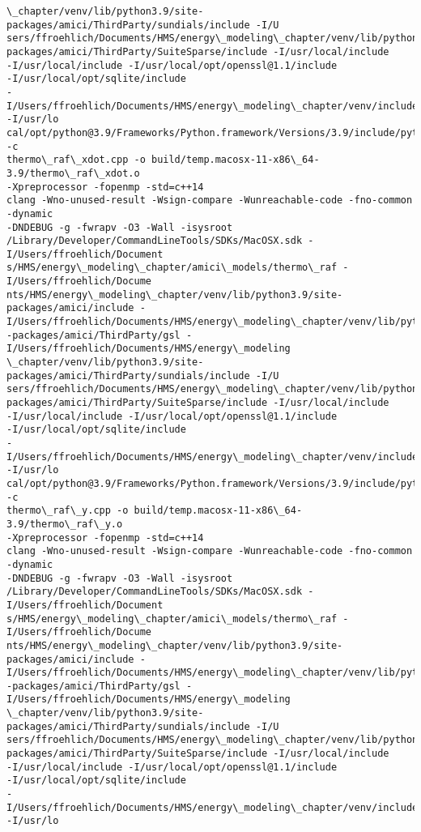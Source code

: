 \documentclass[11pt]{article}
\begin{document}
\begin{Verbatim}[commandchars=\\\{\}]
\_chapter/venv/lib/python3.9/site-packages/amici/ThirdParty/sundials/include -I/U
sers/ffroehlich/Documents/HMS/energy\_modeling\_chapter/venv/lib/python3.9/site-
packages/amici/ThirdParty/SuiteSparse/include -I/usr/local/include
-I/usr/local/include -I/usr/local/opt/openssl@1.1/include
-I/usr/local/opt/sqlite/include
-I/Users/ffroehlich/Documents/HMS/energy\_modeling\_chapter/venv/include -I/usr/lo
cal/opt/python@3.9/Frameworks/Python.framework/Versions/3.9/include/python3.9 -c
thermo\_raf\_xdot.cpp -o build/temp.macosx-11-x86\_64-3.9/thermo\_raf\_xdot.o
-Xpreprocessor -fopenmp -std=c++14
clang -Wno-unused-result -Wsign-compare -Wunreachable-code -fno-common -dynamic
-DNDEBUG -g -fwrapv -O3 -Wall -isysroot
/Library/Developer/CommandLineTools/SDKs/MacOSX.sdk -I/Users/ffroehlich/Document
s/HMS/energy\_modeling\_chapter/amici\_models/thermo\_raf -I/Users/ffroehlich/Docume
nts/HMS/energy\_modeling\_chapter/venv/lib/python3.9/site-packages/amici/include -
I/Users/ffroehlich/Documents/HMS/energy\_modeling\_chapter/venv/lib/python3.9/site
-packages/amici/ThirdParty/gsl -I/Users/ffroehlich/Documents/HMS/energy\_modeling
\_chapter/venv/lib/python3.9/site-packages/amici/ThirdParty/sundials/include -I/U
sers/ffroehlich/Documents/HMS/energy\_modeling\_chapter/venv/lib/python3.9/site-
packages/amici/ThirdParty/SuiteSparse/include -I/usr/local/include
-I/usr/local/include -I/usr/local/opt/openssl@1.1/include
-I/usr/local/opt/sqlite/include
-I/Users/ffroehlich/Documents/HMS/energy\_modeling\_chapter/venv/include -I/usr/lo
cal/opt/python@3.9/Frameworks/Python.framework/Versions/3.9/include/python3.9 -c
thermo\_raf\_y.cpp -o build/temp.macosx-11-x86\_64-3.9/thermo\_raf\_y.o
-Xpreprocessor -fopenmp -std=c++14
clang -Wno-unused-result -Wsign-compare -Wunreachable-code -fno-common -dynamic
-DNDEBUG -g -fwrapv -O3 -Wall -isysroot
/Library/Developer/CommandLineTools/SDKs/MacOSX.sdk -I/Users/ffroehlich/Document
s/HMS/energy\_modeling\_chapter/amici\_models/thermo\_raf -I/Users/ffroehlich/Docume
nts/HMS/energy\_modeling\_chapter/venv/lib/python3.9/site-packages/amici/include -
I/Users/ffroehlich/Documents/HMS/energy\_modeling\_chapter/venv/lib/python3.9/site
-packages/amici/ThirdParty/gsl -I/Users/ffroehlich/Documents/HMS/energy\_modeling
\_chapter/venv/lib/python3.9/site-packages/amici/ThirdParty/sundials/include -I/U
sers/ffroehlich/Documents/HMS/energy\_modeling\_chapter/venv/lib/python3.9/site-
packages/amici/ThirdParty/SuiteSparse/include -I/usr/local/include
-I/usr/local/include -I/usr/local/opt/openssl@1.1/include
-I/usr/local/opt/sqlite/include
-I/Users/ffroehlich/Documents/HMS/energy\_modeling\_chapter/venv/include -I/usr/lo

\end{Verbatim}
\end{document}

